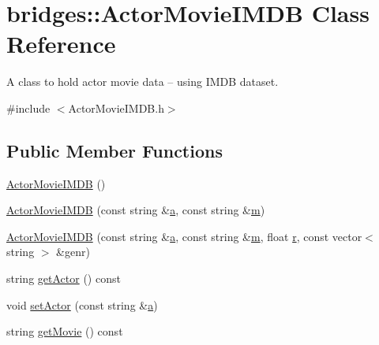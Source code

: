 \hypertarget{classbridges_1_1_actor_movie_i_m_d_b}{}\section{bridges\+::Actor\+Movie\+I\+M\+DB Class Reference}
\label{classbridges_1_1_actor_movie_i_m_d_b}


A class to hold actor movie data -- using I\+M\+DB dataset.  




{\ttfamily \#include $<$Actor\+Movie\+I\+M\+D\+B.\+h$>$}

\subsection*{Public Member Functions}
\begin{DoxyCompactItemize}
\item 
\mbox{\hyperlink{classbridges_1_1_actor_movie_i_m_d_b_acd1db3914821a79a7d8fb506151d36a4}{Actor\+Movie\+I\+M\+DB}} ()
\item 
\mbox{\hyperlink{classbridges_1_1_actor_movie_i_m_d_b_a25dc6c2c2fd93d6add4e11500f81e981}{Actor\+Movie\+I\+M\+DB}} (const string \&\mbox{\hyperlink{namespacebridges_acfb0a4f7877d8f63de3e6862004c50eda0cc175b9c0f1b6a831c399e269772661}{a}}, const string \&\mbox{\hyperlink{namespacebridges_acfb0a4f7877d8f63de3e6862004c50eda6f8f57715090da2632453988d9a1501b}{m}})
\item 
\mbox{\hyperlink{classbridges_1_1_actor_movie_i_m_d_b_a9c8f4acb9530b1a6adebb5ba1d163b4c}{Actor\+Movie\+I\+M\+DB}} (const string \&\mbox{\hyperlink{namespacebridges_acfb0a4f7877d8f63de3e6862004c50eda0cc175b9c0f1b6a831c399e269772661}{a}}, const string \&\mbox{\hyperlink{namespacebridges_acfb0a4f7877d8f63de3e6862004c50eda6f8f57715090da2632453988d9a1501b}{m}}, float \mbox{\hyperlink{namespacebridges_acfb0a4f7877d8f63de3e6862004c50eda4b43b0aee35624cd95b910189b3dc231}{r}}, const vector$<$ string $>$ \&genr)
\item 
string \mbox{\hyperlink{classbridges_1_1_actor_movie_i_m_d_b_a98145ede8d069fed5edce9c631ea6301}{get\+Actor}} () const
\item 
void \mbox{\hyperlink{classbridges_1_1_actor_movie_i_m_d_b_a9fa0b6d2a529c40640966aa078cf7ee2}{set\+Actor}} (const string \&\mbox{\hyperlink{namespacebridges_acfb0a4f7877d8f63de3e6862004c50eda0cc175b9c0f1b6a831c399e269772661}{a}})
\item 
string \mbox{\hyperlink{classbridges_1_1_actor_movie_i_m_d_b_ab0c6e7d290dfe9d847cf3193323c158d}{get\+Movie}} () const

\end{DoxyCompactItemize}
